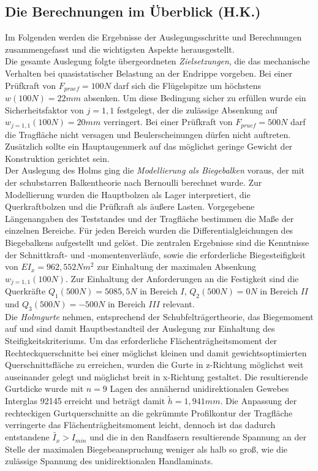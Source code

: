 \subsection{Die Berechnungen im Überblick (H.K.)}
Im Folgenden werden die Ergebnisse der Auslegungsschritte und Berechnungen zusammengefasst und die wichtigsten Aspekte herausgestellt.\\

\noindent Die gesamte Auslegung folgte übergeordneten \textit{Zielsetzungen}, die das mechanische Verhalten bei quasistatischer Belastung an der Endrippe vorgeben. Bei einer Prüfkraft von $ F_{pruef}=100N $ darf sich die Flügelspitze um höchstens $ w(100N)=22mm $ absenken. Um diese Bedingung sicher zu erfüllen wurde ein Sicherheitsfaktor von $ j=1,1 $ festgelegt, der die zulässige Absenkung auf $ w_{j=1,1}(100N)=20mm $ verringert. Bei einer Prüfkraft von $ F_{pruef}=500N $ darf die Tragfläche nicht versagen und Beulerscheinungen dürfen nicht auftreten. Zusätzlich sollte ein Hauptaugenmerk auf das möglichst geringe Gewicht der Konstruktion gerichtet sein.\\

\noindent Der Auslegung des Holms ging die \textit{Modellierung als Biegebalken} voraus, der mit der schubstarren Balkentheorie nach Bernoulli berechnet wurde. Zur Modellierung wurden die Hauptbolzen als Lager interpretiert, die Querkraftbolzen und die Prüfkraft als äußere Lasten. Vorgegebene Längenangaben des Teststandes und der Tragfläche bestimmen die Maße der einzelnen Bereiche. Für jeden Bereich wurden die Differentialgleichungen des Biegebalkens aufgestellt und gelöst. Die zentralen Ergebnisse sind die Kenntnisse der Schnittkraft- und -momentenverläufe, sowie die erforderliche Biegesteifigkeit von $ EI_{x}=962,552Nm^{2} $ zur Einhaltung der maximalen Absenkung $ w_{j=1,1}(100N) $. Zur Einhaltung der Anforderungen an die Festigkeit sind die Querkräfte $ Q_{1}(500N)=5085,5N $ in Bereich $ I $, $ Q_{2}(500N)=0N $ in Bereich $ II $ und $ Q_{3}(500N)=-500N $ in Bereich $ III $ relevant.\\

\noindent Die \textit{Holmgurte} nehmen, entsprechend der Schubfelträgertheorie, das Biegemoment auf und sind damit Hauptbestandteil der Auslegung zur Einhaltung des Steifigkeitskriteriums. Um das erforderliche Flächenträgheitsmoment der Rechteckquerschnitte bei einer möglichst kleinen und damit gewichtsoptimierten Querschnittsfläche zu erreichen, wurden die Gurte in z-Richtung möglichst weit auseinander gelegt und möglichst breit in x-Richtung gestaltet. Die resultierende Gurtdicke wurde mit $ n=9 $ Lagen des annähernd unidirektionalen Gewebes Interglas 92145 erreicht und beträgt damit $ \tilde{h}=1,941mm $. Die Anpassung der rechteckigen Gurtquerschnitte an die gekrümmte Profilkontur der Tragfläche verringerte das Flächenträgheitsmoment leicht, dennoch ist das dadurch entstandene $ \tilde{I_{x}}>I_{min} $ und die in den Randfasern resultierende Spannung an der Stelle der maximalen Biegebeanspruchung weniger als halb so groß, wie die zulässige Spannung des unidirektionalen Handlaminats.\\

